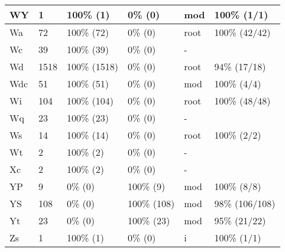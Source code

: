 \begin{figure*}
\begin{tabular}{|l|l|l|l||l|l|}
\hline
 WY & 1 & 100\% (1) & 0\% (0) & mod & 100\% (1/1) \\ 
\hline
 Wa & 72 & 100\% (72) & 0\% (0) & root & 100\% (42/42) \\ 
\hline
 Wc & 39 & 100\% (39) & 0\% (0) & - &  \\ 
\hline
 Wd & 1518 & 100\% (1518) & 0\% (0) & root & 94\% (17/18) \\ 
\hline
 Wdc & 51 & 100\% (51) & 0\% (0) & mod & 100\% (4/4) \\ 
\hline
 Wi & 104 & 100\% (104) & 0\% (0) & root & 100\% (48/48) \\ 
\hline
 Wq & 23 & 100\% (23) & 0\% (0) & - &  \\ 
\hline
 Ws & 14 & 100\% (14) & 0\% (0) & root & 100\% (2/2) \\ 
\hline
 Wt & 2 & 100\% (2) & 0\% (0) & - &  \\ 
\hline
 Xc & 2 & 100\% (2) & 0\% (0) & - &  \\ 
\hline
 YP & 9 & 0\% (0) & 100\% (9) & mod & 100\% (8/8) \\ 
\hline
 YS & 108 & 0\% (0) & 100\% (108) & mod & 98\% (106/108) \\ 
\hline
 Yt & 23 & 0\% (0) & 100\% (23) & mod & 95\% (21/22) \\ 
\hline
 Zs & 1 & 100\% (1) & 0\% (0) & i & 100\% (1/1) \\ 
\hline
\end{tabular}
\end{figure*}
